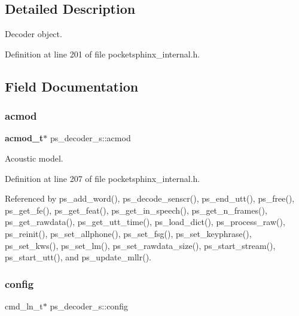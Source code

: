 \subsection{Detailed Description}
Decoder object. 

Definition at line 201 of file pocketsphinx\+\_\+internal.\+h.



\subsection{Field Documentation}
\mbox{\label{structps__decoder__s_af834d2bc1d44c1d9ef607b025413a0b8}} 
\subsubsection{acmod}
{\footnotesize\ttfamily \textbf{ acmod\+\_\+t}$\ast$ ps\+\_\+decoder\+\_\+s\+::acmod}



Acoustic model. 



Definition at line 207 of file pocketsphinx\+\_\+internal.\+h.



Referenced by ps\+\_\+add\+\_\+word(), ps\+\_\+decode\+\_\+senscr(), ps\+\_\+end\+\_\+utt(), ps\+\_\+free(), ps\+\_\+get\+\_\+fe(), ps\+\_\+get\+\_\+feat(), ps\+\_\+get\+\_\+in\+\_\+speech(), ps\+\_\+get\+\_\+n\+\_\+frames(), ps\+\_\+get\+\_\+rawdata(), ps\+\_\+get\+\_\+utt\+\_\+time(), ps\+\_\+load\+\_\+dict(), ps\+\_\+process\+\_\+raw(), ps\+\_\+reinit(), ps\+\_\+set\+\_\+allphone(), ps\+\_\+set\+\_\+fsg(), ps\+\_\+set\+\_\+keyphrase(), ps\+\_\+set\+\_\+kws(), ps\+\_\+set\+\_\+lm(), ps\+\_\+set\+\_\+rawdata\+\_\+size(), ps\+\_\+start\+\_\+stream(), ps\+\_\+start\+\_\+utt(), and ps\+\_\+update\+\_\+mllr().

\mbox{\label{structps__decoder__s_a0565ed97b32408bd05c8104f020cef05}} 
\subsubsection{config}
{\footnotesize\ttfamily cmd\+\_\+ln\+\_\+t$\ast$ ps\+\_\+decoder\+\_\+s\+::config}



